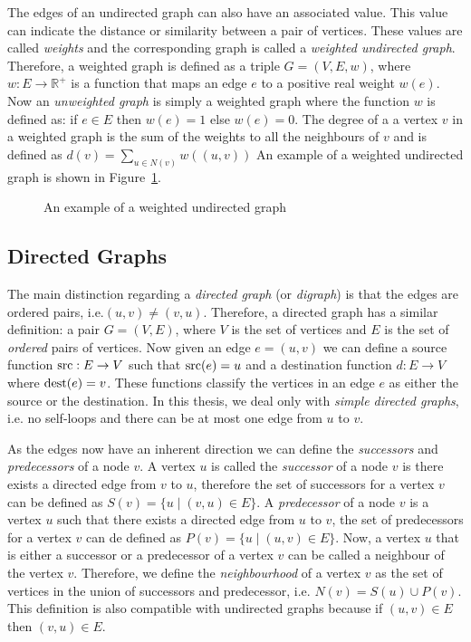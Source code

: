 The edges of an undirected graph can also have an associated value. This value can indicate the distance or similarity between a pair of vertices. These values are called \textit{weights} and the corresponding graph is called a \textit{weighted undirected graph}. Therefore, a weighted graph is defined as a triple $G=(V,E,w)$, where $w:E \rightarrow \mathbb{R}^{+}$ is a function that maps an edge $e$ to a positive real weight $w(e)$. Now an \textit{unweighted graph} is simply a weighted graph where the function $w$ is defined as: if $e \in E$ then $w(e)=1$ else $w(e)=0$. The degree of a a vertex $v$ in a weighted graph is the sum of the weights to all the neighbours of $v$ and is defined as $d(v) = \sum_{u\in N(v)}w((u,v))$ An example of a weighted undirected graph is shown in Figure~\ref{fig:weighted-undirected}. 
\begin{figure}[!ht]
    \centering
    
    \caption{An example of a weighted undirected graph}
    \label{fig:weighted-undirected}
\end{figure}


\subsection{Directed Graphs}
The main distinction regarding a \textit{directed graph} (or \textit{digraph}) is that the edges are ordered pairs, i.e.$(u,v) \neq (v,u)$. Therefore, a directed graph has a similar definition: a pair $G=(V,E)$, where $V$ is the set of vertices and $E$ is the set of \textit{ordered} pairs of vertices. Now given an edge $e=(u,v)$ we can define a source function $\operatorname*{src}:E\rightarrow V$ such that $\operatorname*{src}(e)=u$ and a destination function $d:E\rightarrow V$ where $\operatorname*{dest}(e)=v$. These functions classify the vertices in an edge $e$ as either the source or the destination. In this thesis, we deal only with \textit{simple directed graphs}, i.e. no self-loops and there can be at most one edge from $u$ to $v$. 

As the edges now have an inherent direction we can define the \textit{successors} and \textit{predecessors} of a node $v$. A vertex $u$ is called the \textit{successor} of a node $v$ is there exists a directed edge from $v$ to $u$, therefore the set of successors for a vertex $v$ can be defined as $S(v) = \{u \mid (v,u) \in E\}$. A \textit{predecessor} of a node $v$ is a vertex $u$ such that there exists a directed edge from $u$ to $v$, the set of predecessors for a vertex $v$ can de defined as $P(v) = \{u \mid (u,v) \in E\}$. Now, a vertex $u$ that is either a successor or a predecessor of a vertex $v$ can be called a neighbour of the vertex $v$. Therefore, we define the \textit{neighbourhood} of a vertex $v$ as the set of vertices in the union of successors and predecessor, i.e. $N(v) = S(u) \cup P(v)$. This definition is also compatible with undirected graphs because if $(u,v) \in E$ then $(v,u) \in E$. 

